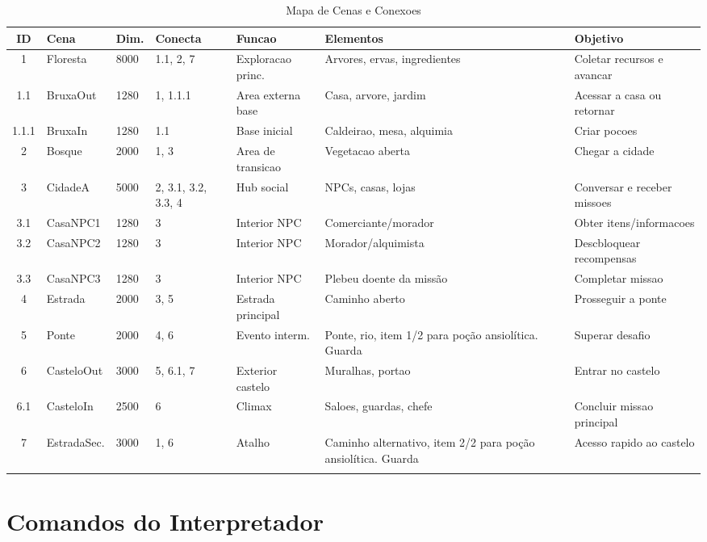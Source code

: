 \documentclass[12pt]{article}
\begin{document}
\scriptsize
\begin{longtable}{|c|p{2.2cm}|p{1.5cm}|p{2cm}|p{2.5cm}|p{2.5cm}|p{2.8cm}|}
\hline
\textbf{ID} & \textbf{Cena} & \textbf{Dim.} & \textbf{Conecta} & \textbf{Funcao} & \textbf{Elementos} & \textbf{Objetivo} \\
\hline
1 & Floresta & 8000 & 1.1, 2, 7 & Exploracao princ. & Arvores, ervas, ingredientes & Coletar recursos e avancar \\
1.1 & BruxaOut & 1280 & 1, 1.1.1 & Area externa base & Casa, arvore, jardim & Acessar a casa ou retornar \\
1.1.1 & BruxaIn & 1280 & 1.1 & Base inicial & Caldeirao, mesa, alquimia & Criar pocoes \\
\hline
2 & Bosque & 2000 & 1, 3 & Area de transicao & Vegetacao aberta & Chegar a cidade \\
\hline
3 & CidadeA & 5000 & 2, 3.1, 3.2, 3.3, 4 & Hub social & NPCs, casas, lojas & Conversar e receber missoes \\
3.1 & CasaNPC1 & 1280 & 3 & Interior NPC & Comerciante/morador & Obter itens/informacoes \\
3.2 & CasaNPC2 & 1280 & 3 & Interior NPC & Morador/alquimista & Descbloquear recompensas \\
3.3 & CasaNPC3 & 1280 & 3 & Interior NPC & Plebeu doente da missão & Completar missao \\
\hline
4 & Estrada & 2000 & 3, 5 & Estrada principal & Caminho aberto & Prosseguir a ponte \\
\hline
5 & Ponte & 2000 & 4, 6 & Evento interm. & Ponte, rio, item 1/2 para poção ansiolítica. Guarda& Superar desafio \\
\hline
6 & CasteloOut & 3000 & 5, 6.1, 7 & Exterior castelo & Muralhas, portao & Entrar no castelo \\
6.1 & CasteloIn & 2500 & 6 & Climax & Saloes, guardas, chefe & Concluir missao principal \\
\hline
7 & EstradaSec. & 3000 & 1, 6 & Atalho & Caminho alternativo, item 2/2 para poção ansiolítica. Guarda & Acesso rapido ao castelo \\
\hline
\caption{Mapa de Cenas e Conexoes}
\end{longtable}
\normalsize

\newpage

\section{Comandos do Interpretador}
\end{document}
